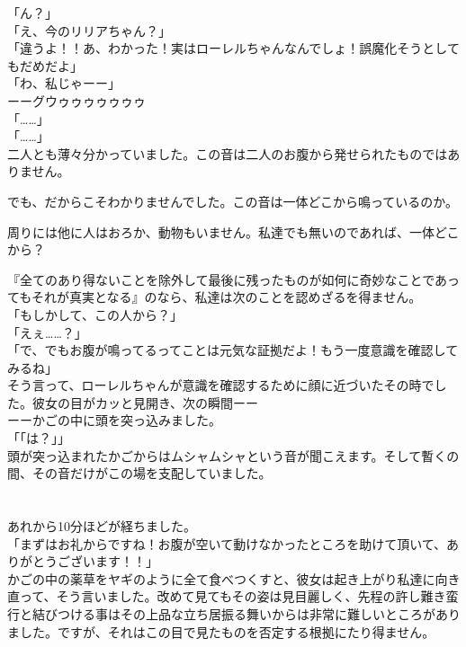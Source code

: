 \documentclass[oneside, a4paper]{jsbook}
\begin{document}
\noindent
「ん？」\\
「え、今のリリアちゃん？」\\
「違うよ！！あ、わかった！実はローレルちゃんなんでしょ！誤魔化そうとしてもだめだよ」\\
「わ、私じゃーー」\\

ーーグウゥゥゥゥゥゥゥ\\

\noindent
「……」\\
「……」\\

二人とも薄々分かっていました。この音は二人のお腹から発せられたものではありません。

でも、だからこそわかりませんでした。この音は一体どこから鳴っているのか。

周りには他に人はおろか、動物もいません。私達でも無いのであれば、一体どこから？

『全てのあり得ないことを除外して最後に残ったものが如何に奇妙なことであってもそれが真実となる』のなら、私達は次のことを認めざるを得ません。\\

\noindent
「もしかして、この人から？」\\
「えぇ……？」\\
「で、でもお腹が鳴ってるってことは元気な証拠だよ！もう一度意識を確認してみるね」\\

そう言って、ローレルちゃんが意識を確認するために顔に近づいたその時でした。彼女の目がカッと見開き、次の瞬間ーー\\

ーーかごの中に頭を突っ込みました。\\

\noindent
「「は？」」\\

頭が突っ込まれたかごからはムシャムシャという音が聞こえます。そして暫くの間、その音だけがこの場を支配していました。\\\\\\

あれから10分ほどが経ちました。\\

\noindent
「まずはお礼からですね！お腹が空いて動けなかったところを助けて頂いて、ありがとうございます！！」\\

かごの中の薬草をヤギのように全て食べつくすと、彼女は起き上がり私達に向き直って、そう言いました。改めて見てもその姿は見目麗しく、先程の許し難き蛮行と結びつける事はその上品な立ち居振る舞いからは非常に難しいところがありました。ですが、それはこの目で見たものを否定する根拠にたり得ません。\\
\end{document}
